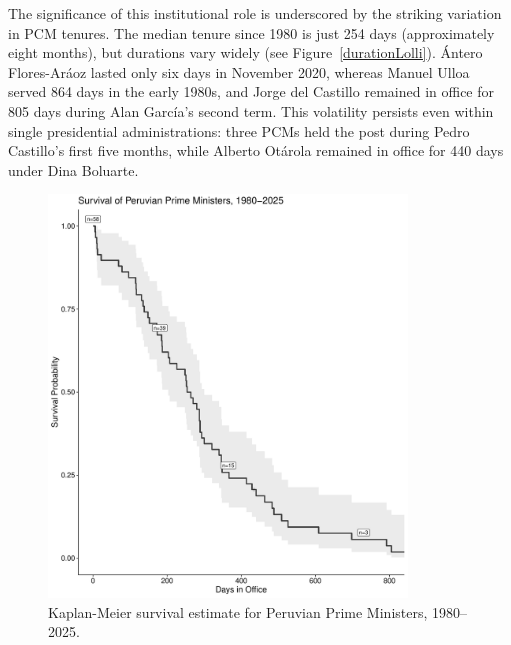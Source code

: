 \documentclass[a4paper, 12pt]{article}
\begin{document}
The significance of this institutional role is underscored by the striking variation in PCM tenures. The median tenure since 1980 is just 254 days (approximately eight months), but durations vary widely (see Figure~\ref{durationLolli}). Ántero Flores-Aráoz lasted only six days in November 2020, whereas Manuel Ulloa served 864 days in the early 1980s, and Jorge del Castillo remained in office for 805 days during Alan García’s second term. This volatility persists even within single presidential administrations: three PCMs held the post during Pedro Castillo’s first five months, while Alberto Otárola remained in office for 440 days under Dina Boluarte. 

\begin{figure}[ht]
\centering
\includegraphics[width=0.85\textwidth]{kaplanDuration.pdf}
\caption[Survival of Prime Ministers in Peru]{Kaplan-Meier survival estimate for Peruvian Prime Ministers, 1980--2025.}
\label{kaplanDuration} 
\end{figure}
\end{document}
